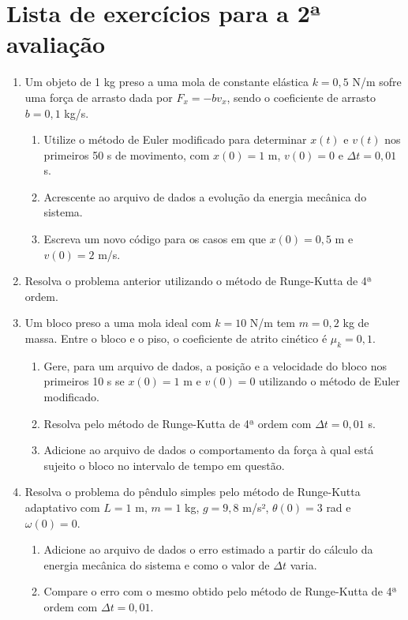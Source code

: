 \documentclass{article}
\begin{document}
\section*{Lista de exercícios para a 2ª avaliação}

\begin{enumerate}
    \item Um objeto de 1 kg preso a uma mola de constante elástica $k = 0,5$ N/m sofre uma força de arrasto dada por $F_x = -bv_x$, sendo o coeficiente de arrasto $b = 0,1$ kg/s.
    \begin{enumerate}
        \item Utilize o método de Euler modificado para determinar $x(t)$ e $v(t)$ nos primeiros 50 s de movimento, com $x(0) = 1$ m, $v(0) = 0$ e $\Delta t = 0,01$ s.
        \item Acrescente ao arquivo de dados a evolução da energia mecânica do sistema.
        \item Escreva um novo código para os casos em que $x(0) = 0,5$ m e $v(0) = 2$ m/s.
    \end{enumerate}
    
    \item Resolva o problema anterior utilizando o método de Runge-Kutta de 4ª ordem.
    
    \item Um bloco preso a uma mola ideal com $k = 10$ N/m tem $m = 0,2$ kg de massa. Entre o bloco e o piso, o coeficiente de atrito cinético é $\mu_k = 0,1$.
    \begin{enumerate}
        \item Gere, para um arquivo de dados, a posição e a velocidade do bloco nos primeiros 10 s se $x(0) = 1$ m e $v(0) = 0$ utilizando o método de Euler modificado.
        \item Resolva pelo método de Runge-Kutta de 4ª ordem com $\Delta t = 0,01$ s.
        \item Adicione ao arquivo de dados o comportamento da força à qual está sujeito o bloco no intervalo de tempo em questão.
    \end{enumerate}
    
    \item Resolva o problema do pêndulo simples pelo método de Runge-Kutta adaptativo com $L = 1$ m, $m = 1$ kg, $g = 9,8$ m/s², $\theta(0) = 3$ rad e $\omega(0) = 0$.
    \begin{enumerate}
        \item Adicione ao arquivo de dados o erro estimado a partir do cálculo da energia mecânica do sistema e como o valor de $\Delta t$ varia.
        \item Compare o erro com o mesmo obtido pelo método de Runge-Kutta de 4ª ordem com $\Delta t = 0,01$.
    \end{enumerate}
    

\end{enumerate}
\end{document}
